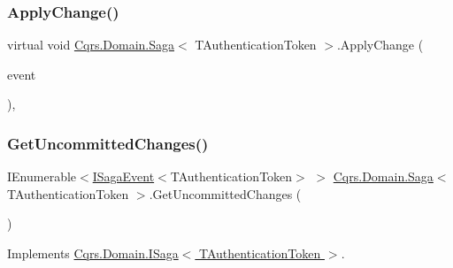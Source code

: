 \mbox{\label{classCqrs_1_1Domain_1_1Saga_a25462563492d834e297388e0648a57ac_a25462563492d834e297388e0648a57ac}} 
\subsubsection{\texorpdfstring{Apply\+Change()}{ApplyChange()}\hspace{0.1cm}{\footnotesize\ttfamily [2/2]}}
{\footnotesize\ttfamily virtual void \hyperlink{classCqrs_1_1Domain_1_1Saga}{Cqrs.\+Domain.\+Saga}$<$ T\+Authentication\+Token $>$.Apply\+Change (\begin{DoxyParamCaption}\item[{\hyperlink{interfaceCqrs_1_1Events_1_1IEvent}{I\+Event}$<$ T\+Authentication\+Token $>$ @}]{event }\end{DoxyParamCaption})\hspace{0.3cm}{\ttfamily [protected]}, {\ttfamily [virtual]}}

\mbox{\label{classCqrs_1_1Domain_1_1Saga_a043e8e21e7550c34f5848af7a87e33cd_a043e8e21e7550c34f5848af7a87e33cd}} 
\subsubsection{\texorpdfstring{Get\+Uncommitted\+Changes()}{GetUncommittedChanges()}}
{\footnotesize\ttfamily I\+Enumerable$<$\hyperlink{interfaceCqrs_1_1Events_1_1ISagaEvent}{I\+Saga\+Event}$<$T\+Authentication\+Token$>$ $>$ \hyperlink{classCqrs_1_1Domain_1_1Saga}{Cqrs.\+Domain.\+Saga}$<$ T\+Authentication\+Token $>$.Get\+Uncommitted\+Changes (\begin{DoxyParamCaption}{ }\end{DoxyParamCaption})}



Implements \hyperlink{interfaceCqrs_1_1Domain_1_1ISaga_abb77811b4f7d19adb61f9d33da18e7e0_abb77811b4f7d19adb61f9d33da18e7e0}{Cqrs.\+Domain.\+I\+Saga$<$ T\+Authentication\+Token $>$}.

